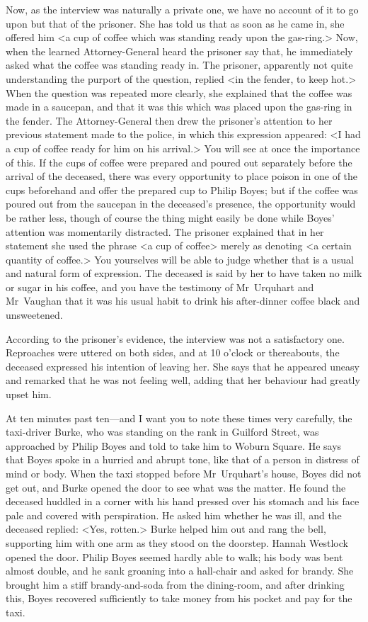 Now, as the interview was naturally a private one, we have no account of it to go upon but that of the prisoner. She has told us that as soon as he came in, she offered him <a cup of coffee which was standing ready upon the gas-ring.> Now, when the learned Attorney-General heard the prisoner say that, he immediately asked what the coffee was standing ready in. The prisoner, apparently not quite understanding the purport of the question, replied <in the fender, to keep hot.> When the question was repeated more clearly, she explained that the coffee was made in a saucepan, and that it was this which was placed upon the gas-ring in the fender. The Attorney-General then drew the prisoner's attention to her previous statement made to the police, in which this expression appeared: <I had a cup of coffee ready for him on his arrival.> You will see at once the importance of this. If the cups of coffee were prepared and poured out separately before the arrival of the deceased, there was every opportunity to place poison in one of the cups beforehand and offer the prepared cup to Philip Boyes; but if the coffee was poured out from the saucepan in the deceased's presence, the opportunity would be rather less, though of course the thing might easily be done while Boyes' attention was momentarily distracted. The prisoner explained that in her statement she used the phrase <a cup of coffee> merely as denoting <a certain quantity of coffee.> You yourselves will be able to judge whether that is a usual and natural form of expression. The deceased is said by her to have taken no milk or sugar in his coffee, and you have the testimony of Mr~Urquhart and Mr~Vaughan that it was his usual habit to drink his after-dinner coffee black and unsweetened.

According to the prisoner's evidence, the interview was not a satisfactory one. Reproaches were uttered on both sides, and at 10 o'clock or thereabouts, the deceased expressed his intention of leaving her. She says that he appeared uneasy and remarked that he was not feeling well, adding that her behaviour had greatly upset him.

At ten minutes past ten—and I want you to note these times very carefully, the taxi-driver Burke, who was standing on the rank in Guilford Street, was approached by Philip Boyes and told to take him to Woburn Square. He says that Boyes spoke in a hurried and abrupt tone, like that of a person in distress of mind or body. When the taxi stopped before Mr~Urquhart's house, Boyes did not get out, and Burke opened the door to see what was the matter. He found the deceased huddled in a corner with his hand pressed over his stomach and his face pale and covered with perspiration. He asked him whether he was ill, and the deceased replied: <Yes, rotten.> Burke helped him out and rang the bell, supporting him with one arm as they stood on the doorstep. Hannah Westlock opened the door. Philip Boyes seemed hardly able to walk; his body was bent almost double, and he sank groaning into a hall-chair and asked for brandy. She brought him a stiff brandy-and-soda from the dining-room, and after drinking this, Boyes recovered sufficiently to take money from his pocket and pay for the taxi.

